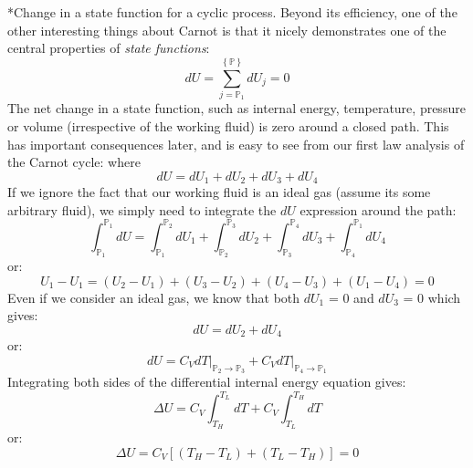\documentclass[11pt]{article}
\makeatletter
\theoremstyle{definition}
\renewcommand\subsection{\@startsection
	{subsection}{2}{0mm}
	{-0.05in}
	{-0.5\baselineskip}
	{\normalfont\normalsize\bfseries}}
\makeatother
\begin{document}
\subsection*{Change in a state function for a cyclic process.}
Beyond its efficiency, one of the other interesting things about Carnot is that it nicely demonstrates one of the central properties of \textit{state functions}:
\begin{equation}
dU = \sum_{j=\mathbb{P}_{1}}^{\left\{\mathbb{P}\right\}}dU_j = 0
\end{equation}The net change in a state function, such as internal energy, temperature, pressure or volume (irrespective of the working fluid) is zero around a closed path.
This has important consequences later, and is easy to see from our first law analysis of the Carnot cycle: where
\begin{equation}
dU = dU_{1}+dU_{2}+dU_{3}+dU_{4}
\end{equation}If we ignore the fact that our working fluid is an ideal gas (assume its some arbitrary fluid), we simply need to integrate the $dU$ expression around the
path:
\begin{equation}
\int_{\mathbb{P}_{1}}^{\mathbb{P}_{1}}dU = \int_{\mathbb{P}_{1}}^{\mathbb{P}_{2}}dU_{1}+\int_{\mathbb{P}_{2}}^{\mathbb{P}_{3}}dU_{2}+\int_{\mathbb{P}_{3}}^{\mathbb{P}_{4}}dU_{3}+\int_{\mathbb{P}_{4}}^{\mathbb{P}_{1}}dU_{4}
\end{equation}or:
\begin{equation}
U_{1} - U_{1} = \left(U_{2} - U_{1}\right) + \left(U_{3} - U_{2}\right) + \left(U_{4} - U_{3}\right) + \left(U_{1} - U_{4}\right) = 0
\end{equation}Even if we consider an ideal gas, we know that both $dU_{1}$ = 0 and $dU_{3}$ = 0 which gives:
\begin{equation}
dU  = dU_{2} + dU_{4}
\end{equation}or:
\begin{equation}
dU = C_{V}dT\Bigr|_{\mathbb{P}_{2}\rightarrow\mathbb{P}_{3}}+C_{V}dT\Bigr|_{\mathbb{P}_{4}\rightarrow\mathbb{P}_{1}}
\end{equation}Integrating both sides of the differential internal energy equation gives:
\begin{equation}
\Delta{U} = C_{V}\int_{T_{H}}^{T_{L}}dT+C_{V}\int_{T_{L}}^{T_{H}}dT
\end{equation}or:
\begin{equation}
\Delta{U} = C_{V}\left[\left(T_{H} - T_{L}\right)+\left(T_{L} - T_{H}\right)\right] = 0
\end{equation}
\end{document}
